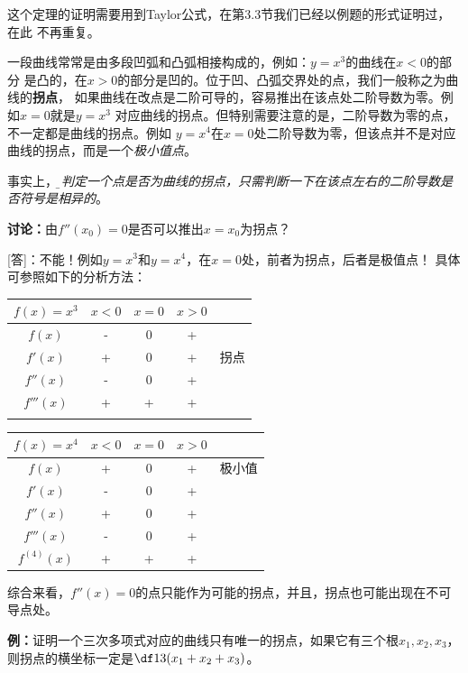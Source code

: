 这个定理的证明需要用到Taylor公式，在第3.3节我们已经以例题的形式证明过，在此
不再重复。

一段曲线常常是由多段凹弧和凸弧相接构成的，例如：$y=x^3$的曲线在$x<0$的部分
是凸的，在$x>0$的部分是凹的。位于凹、凸弧交界处的点，我们一般称之为曲线的{\bf 拐点}，
如果曲线在改点是二阶可导的，容易推出在该点处二阶导数为零。例如$x=0$就是$y=x^3$
对应曲线的拐点。但特别需要注意的是，二阶导数为零的点，不一定都是曲线的拐点。例如
$y=x^4$在$x=0$处二阶导数为零，但该点并不是对应曲线的拐点，而是一个{\it 极小值点}。

事实上，{\it\b 要判定一个点是否为曲线的拐点，只需判断一下在该点左右的二阶导数是否符号是相异的}。

\begin{shaded}
	{\bf 讨论：}由$f''(x_0)=0$是否可以推出$x=x_0$为拐点？

	[答]：不能！例如$y=x^3$和$y=x^4$，在$x=0$处，前者为拐点，后者是极值点！
	具体可参照如下的分析方法：
	\begin{center}
	\begin{tabular}{c||c|c|c|c}
		\hline 
		$f(x)=x^3$ & $x<0$ & $x=0$ & $x>0$ & \\ 
		\hline 
		$f(x)$ & - & 0 & + & \\ 
		\hline 
		$f'(x)$ & + & 0 & + & 拐点\\ 
		\hline 
		$f''(x)$ & - & 0 & + & \\ 
		\hline 
		$f'''(x)$ & + & + & + & \\ 
		\hline 
		 &  &  &  &  \\ 
		\hline 
	\end{tabular} 
	\begin{tabular}{c||c|c|c|c}
		\hline 
		$f(x)=x^4$ & $x<0$ & $x=0$ & $x>0$ & \\ 
		\hline 
		$f(x)$ & + & 0 & + & 极小值\\ 
		\hline 
		$f'(x)$ & - & 0 & + & \\ 
		\hline 
		$f''(x)$ & + & 0 & + & \\ 
		\hline 
		$f'''(x)$ & - & 0 & + & \\ 
		\hline 
		$f^{(4)}(x)$ & + & + & + & \\ 
		\hline 
	\end{tabular} 
	\end{center}
	
	综合来看，$f''(x)=0$的点只能作为可能的拐点，并且，拐点也可能出现在不可导点处。
\end{shaded}

{\bf 例：}证明一个三次多项式对应的曲线只有唯一的拐点，如果它有三个根$x_1,x_2,x_3$，
则拐点的横坐标一定是$\df13(x_1+x_2+x_3)$。

